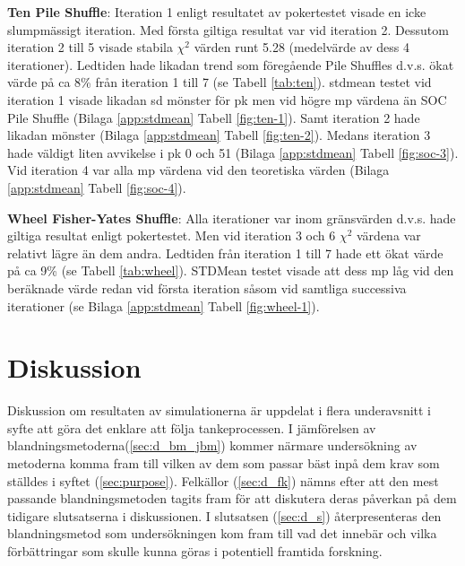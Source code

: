 \documentclass[swedish,a4paper]{article}
\begin{document}
\textbf{Ten Pile Shuffle}: Iteration 1 enligt resultatet av pokertestet visade
en icke slumpmässigt iteration. Med första giltiga resultat var vid iteration
2. Dessutom iteration 2 till 5 visade stabila $\chi^2$ värden runt 5.28
(medelvärde av dess 4 iterationer). Ledtiden hade likadan trend som föregående
Pile Shuffles d.v.s. ökat värde på ca 8\% från iteration 1 till 7 (se Tabell
\ref{tab:ten}). \gls{stdmean} testet vid iteration 1 visade likadan \gls{sd}
mönster för \gls{pk} men vid högre \gls{mp} värdena än SOC Pile Shuffle (Bilaga
\ref{app:stdmean} Tabell \ref{fig:ten-1}). Samt iteration 2 hade likadan mönster
(Bilaga \ref{app:stdmean} Tabell \ref{fig:ten-2}). Medans iteration 3 hade
väldigt liten avvikelse i \gls{pk} 0 och 51 (Bilaga \ref{app:stdmean} Tabell
\ref{fig:soc-3}). Vid iteration 4 var alla \gls{mp} värdena vid den teoretiska
värden (Bilaga \ref{app:stdmean} Tabell \ref{fig:soc-4}).


\textbf{Wheel Fisher-Yates Shuffle}: Alla iterationer var inom gränsvärden d.v.s.
hade giltiga resultat enligt pokertestet. Men vid iteration 3 och 6 $\chi^2$
värdena var relativt lägre än dem andra. Ledtiden från iteration 1 till 7 hade
ett ökat värde på ca 9\% (se Tabell \ref{tab:wheel}). STDMean testet visade att
dess \gls{mp} låg vid den beräknade värde redan vid första iteration såsom vid
samtliga successiva iterationer (se Bilaga \ref{app:stdmean} Tabell
\ref{fig:wheel-1}). 



\section{Diskussion}
Diskussion om resultaten av simulationerna är uppdelat i flera underavsnitt i
syfte att göra det enklare att följa tankeprocessen.
I jämförelsen av
blandningsmetoderna(\ref{sec:d_bm_jbm}) kommer närmare undersökning av metoderna
komma fram till vilken av dem som passar bäst inpå dem krav som ställdes i
syftet (\ref{sec:purpose}). Felkällor (\ref{sec:d_fk}) nämns efter att den mest
passande blandningsmetoden tagits fram för att diskutera deras påverkan på dem
tidigare slutsatserna i diskussionen. I slutsatsen (\ref{sec:d_s})
återpresenteras den blandningsmetod som undersökningen kom fram till vad det
innebär och vilka förbättringar som skulle kunna göras i potentiell framtida
forskning.
\end{document}
